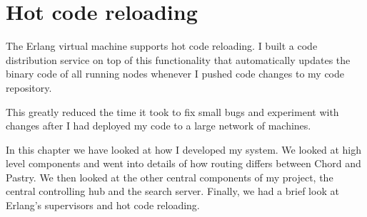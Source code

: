 \section{Hot code reloading}
The Erlang virtual machine supports hot code reloading.
I built a code distribution service on top of this functionality that automatically updates the binary code of all running nodes whenever I pushed code changes to my code repository.

This greatly reduced the time it took to fix small bugs and experiment with changes after I had deployed my code to a large network of machines.

\mbox{}

In this chapter we have looked at how I developed my system. We looked at high level components and went into details of how routing differs between Chord and Pastry. We then looked at the other central components of my project, the central controlling hub and the search server.
Finally, we had a brief look at Erlang's supervisors and hot code reloading.
